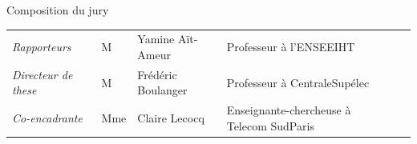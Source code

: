 \begin{titlepage}
{\large Composition du jury}

\noindent\begin{tabulary}{\textwidth}{@{}p{0.2\textwidth}p{2em}p{0.2\textwidth}p{0.46\textwidth}L}
\midrule
\textit{Rapporteurs}         & M   & Yamine Aït-Ameur   & Professeur à l'ENSEEIHT \\
\textit{Directeur de these}  & M   & Frédéric Boulanger & Professeur à CentraleSupélec \\
\textit{Co-encadrante}       & Mme & Claire Lecocq      & Enseignante-chercheuse à Telecom SudParis \\
\midrule
\end{tabulary}


\end{titlepage}
\restoregeometry
\thispagestyle{empty}
\cleardoublepage
